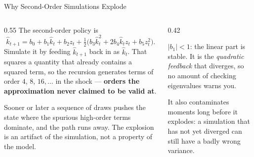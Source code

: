 \begin{frame}{Why Second-Order Simulations Explode}
\begin{columns}[T]
\begin{column}{0.55\textwidth}
\small
The second-order policy is
\[
  \hat{k}_{t+1}= b_0 + b_1\hat{k}_t + b_2 z_t
  + \tfrac12\big(b_3\hat{k}_t^{2}+2b_4\hat{k}_tz_t+b_5z_t^{2}\big).
\]
Simulate it by feeding $\hat{k}_{t+1}$ back in as $\hat{k}_t$. That squares a quantity that already contains a squared term, so the recursion generates terms of order $4$, $8$, $16,\dots$ in the shock --- \textbf{orders the approximation never claimed to be valid at}.
\medskip

Sooner or later a sequence of draws pushes the state where the spurious high-order terms dominate, and the path runs away. The explosion is an artifact of the simulation, not a property of the model.
\end{column}
\begin{column}{0.42\textwidth}
\begin{cautionbox}[title=\textbf{Not a stability problem}]\small
$|b_1|<1$: the linear part is stable. It is the \emph{quadratic feedback} that diverges, so no amount of checking eigenvalues warns you.
\end{cautionbox}
\medskip
\begin{examplebox}\footnotesize
It also contaminates moments long before it explodes: a simulation that has not yet diverged can still have a badly wrong variance.
\end{examplebox}
\end{column}
\end{columns}
\end{frame}

